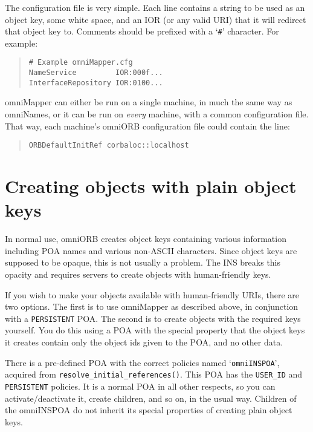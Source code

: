 \documentclass[11pt,oneside,a4paper]{book}
\newcommand{\code}[1]{\texttt{#1}}
\newcommand{\op}[1]{\texttt{#1()}}
\begin{document}
The configuration file is very simple. Each line contains a string to
be used as an object key, some white space, and an IOR (or any valid
URI) that it will redirect that object key to. Comments should be
prefixed with a `\texttt{\#}' character. For example:

\begin{quote}
\begin{verbatim}
# Example omniMapper.cfg
NameService         IOR:000f...
InterfaceRepository IOR:0100...
\end{verbatim}
\end{quote}

\noindent omniMapper can either be run on a single machine, in much
the same way as omniNames, or it can be run on \emph{every} machine,
with a common configuration file. That way, each machine's omniORB
configuration file could contain the line:

\begin{quote}
\begin{verbatim}
ORBDefaultInitRef corbaloc::localhost
\end{verbatim}
\end{quote}



\section{Creating objects with plain object keys}

In normal use, omniORB creates object keys containing various
information including POA names and various non-ASCII characters.
Since object keys are supposed to be opaque, this is not usually a
problem. The INS breaks this opacity and requires servers to create
objects with human-friendly keys.

If you wish to make your objects available with human-friendly URIs,
there are two options. The first is to use omniMapper as described
above, in conjunction with a \code{PERSISTENT} POA. The second is to
create objects with the required keys yourself. You do this using a
POA with the special property that the object keys it creates contain
only the object ids given to the POA, and no other data.

There is a pre-defined POA with the correct policies named
`\texttt{omniINSPOA}', acquired from
\op{resolve\_initial\_references}. This POA has the \code{USER\_ID}
and \code{PERSISTENT} policies. It is a normal POA in all other
respects, so you can activate/deactivate it, create children, and so
on, in the usual way. Children of the omniINSPOA do not inherit its
special properties of creating plain object keys.
\end{document}
